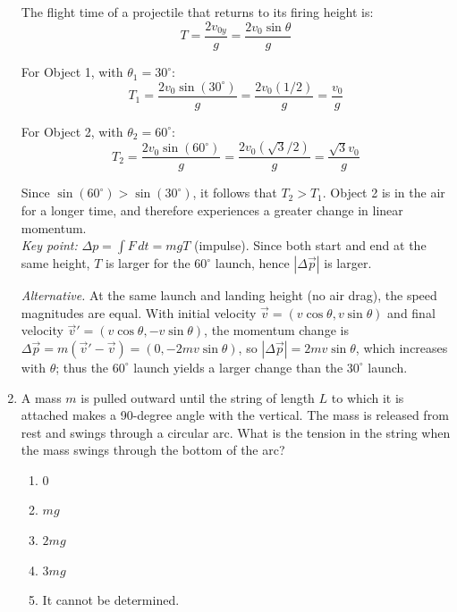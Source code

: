 ﻿\documentclass[12pt, a4paper]{article}
\begin{document}
\begin{CJK*}{UTF8}{gbsn}
\begin{enumerate}[itemsep=1.0em, topsep=0.6em]
\begin{solutionbox}
The flight time of a projectile that returns to its firing height is:
\[
T = \frac{2v_{0y}}{g} = \frac{2v_0 \sin\theta}{g}
\]

For Object 1, with $\theta_1 = 30^{\circ}$:
\[
T_1 = \frac{2v_0 \sin(30^{\circ})}{g} = \frac{2v_0(1/2)}{g} = \frac{v_0}{g}
\]

For Object 2, with $\theta_2 = 60^{\circ}$:
\[
T_2 = \frac{2v_0 \sin(60^{\circ})}{g} = \frac{2v_0(\sqrt{3}/2)}{g} = \frac{\sqrt{3}v_0}{g}
\]

Since $\sin(60^{\circ}) > \sin(30^{\circ})$, it follows that $T_2 > T_1$. Object 2 is in the air for a longer time, and therefore experiences a greater change in linear momentum.
\\
\emph{Key point:} $\Delta p=\int F\,dt=mgT$ (impulse). Since both start and end at the same height, $T$ is larger for the $60^\circ$ launch, hence $|\Delta \vec p|$ is larger.
\end{solutionbox}

\par\smallskip\textit{Alternative.} At the same launch and landing height (no air drag), the speed magnitudes are equal. With initial velocity $\vec v=(v\cos\theta, v\sin\theta)$ and final velocity $\vec v'=(v\cos\theta, -v\sin\theta)$, the momentum change is $\Delta\vec p=m(\vec v'-\vec v)=(0,-2mv\sin\theta)$, so $|\Delta\vec p|=2mv\sin\theta$, which increases with $\theta$; thus the $60^\circ$ launch yields a larger change than the $30^\circ$ launch.

\item \label{prob:2}
A mass $m$ is pulled outward until the string of length $L$ to which it is attached makes a 90-degree angle with the vertical. The mass is released from rest and swings through a circular arc. What is the tension in the string when the mass swings through the bottom of the arc?
\begin{enumerate}[label=(\Alph*)]
    \item 0
    \item $mg$
    \item $2mg$
    \item $3mg$
    \item It cannot be determined.
\end{enumerate}


\end{enumerate}
\end{CJK*}
\end{document}
